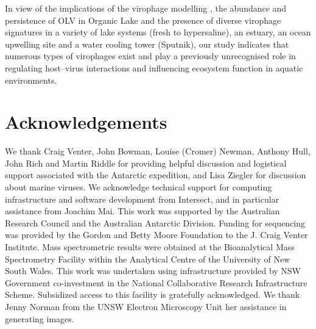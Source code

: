 In view of the implications of the virophage modelling , the abundance and persistence of \ac{OLV} in Organic Lake and the presence of diverse virophage signatures in a variety of lake systems (fresh to hypersaline), an estuary, an ocean upwelling site and a water cooling tower (Sputnik), our study indicates that numerous types of virophages exist and play a previously unrecognised role in regulating host--virus interactions and influencing ecosystem function in aquatic environments. 


\section{Acknowledgements}
We thank Craig Venter, John Bowman, Louise (Cromer) Newman, Anthony Hull, John Rich and Martin Riddle for providing helpful discussion and logistical support associated with the Antarctic expedition, and Lisa Ziegler for discussion about marine viruses. 
We acknowledge technical support for computing infrastructure and software development from Intersect, and in particular assistance from Joachim Mai. 
This work was supported by the Australian Research Council and the Australian Antarctic Division. 
Funding for sequencing was provided by the Gordon and Betty Moore Foundation to the J. Craig Venter Institute. 
Mass spectrometric results were obtained at the Bioanalytical Mass Spectrometry Facility within the Analytical Centre of the University of New South Wales. 
This work was undertaken using infrastructure provided by NSW Government co-investment in the National Collaborative Research Infrastructure Scheme. 
Subsidized access to this facility is gratefully acknowledged. 
We thank Jenny Norman from the UNSW Electron Microscopy Unit her assistance in generating images. 
